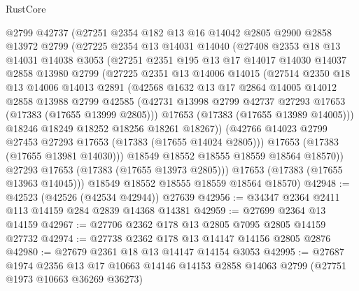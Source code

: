 \begin{lexlean}{RustCore}
\begin{coremodule}
        @2799
        @42737
        (@27251
          @2354
          @182
          @13
          @16
          @14042
          @2805
          @2900
          @2858
          @13972
          @2799
          (@27225
            @2354
            @13
            @14031
            @14040
            (@27408
              @2353
              @18
              @13
              @14031
              @14038
              @3053
              (@27251
                @2351
                @195
                @13
                @17
                @14017
                @14030
                @14037
                @2858
                @13980
                @2799
                (@27225
                  @2351
                  @13
                  @14006
                  @14015
                  (@27514
                    @2350
                    @18
                    @13
                    @14006
                    @14013
                    @2891
                    (@42568
                      @1632
                      @13
                      @17
                      @2864
                      @14005
                      @14012
                      @2858
                      @13988
                      @2799
                      @42585
                      (@42731 @13998 @2799 @42737 @27293 @17653 (@17383 (@17655 @13999 @2805)))
                      @17653
                      (@17383 (@17655 @13989 @14005)))
                    @18246
                    @18249
                    @18252
                    @18256
                    @18261
                    @18267))
                (@42766 @14023 @2799 @27453 @27293 @17653 (@17383 (@17655 @14024 @2805)))
                @17653
                (@17383 (@17655 @13981 @14030)))
              @18549
              @18552
              @18555
              @18559
              @18564
              @18570))
          @27293
          @17653
          (@17383 (@17655 @13973 @2805)))
        @17653
        (@17383 (@17655 @13963 @14045)))
      @18549
      @18552
      @18555
      @18559
      @18564
      @18570)
@42948 := @42523 (@42526 (@42534 @42944)) @27639
@42956 := @34347 @2364 @2411 @113 @14159 @284 @2839 @14368 @14381
@42959 := @27699 @2364 @13 @14159
@42967 := @27706 @2362 @178 @13 @2805 @7095 @2805 @14159 @27732
@42974 := @27738 @2362 @178 @13 @14147 @14156 @2805 @2876
@42980 := @27679 @2361 @18 @13 @14147 @14154 @3053
@42995 := @27687
    @1974
    @2356
    @13
    @17
    @10663
    @14146
    @14153
    @2858
    @14063
    @2799
    (@27751 @1973 @10663 @36269 @36273)

\end{coremodule}
\end{lexlean}
